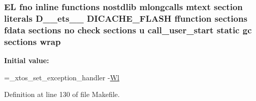 \hypertarget{Makefile_a6b04d3dc9ff8a69521845b59ef6c33f1}{
\subsubsection[{wrap}]{\setlength{\rightskip}{0pt plus 5cm}E\-L fno inline functions nostdlib mlongcalls mtext section literals D\-\_\-\-\_\-ets\-\_\-\-\_\- D\-I\-C\-A\-C\-H\-E\-\_\-\-F\-L\-A\-S\-H ffunction sections fdata sections no check sections u call\-\_\-user\-\_\-start static gc sections wrap\hspace{0.3cm}{\ttfamily [static]}}}\label{Makefile_a6b04d3dc9ff8a69521845b59ef6c33f1}
{\bfseries Initial value\-:}
\begin{DoxyCode}
=\_xtos\_set\_exception\_handler 
    -\hyperlink{Makefile_a1af3a6ecef406b93f1a1db145b2cfd43}{Wl}
\end{DoxyCode}


Definition at line 130 of file Makefile.

